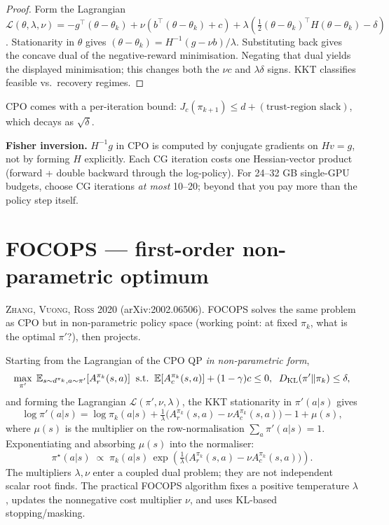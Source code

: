 \documentclass[11pt,oneside]{scrbook}
\begin{document}
\begin{proof}[Proof]
Form the Lagrangian
$\mathcal{L}(\theta, \lambda, \nu) = -g^\top(\theta-\theta_k) + \nu(b^\top(\theta-\theta_k) + c) + \lambda(\tfrac12 (\theta-\theta_k)^\top H (\theta-\theta_k) - \delta)$.
Stationarity in $\theta$ gives $(\theta-\theta_k) = H^{-1}(g - \nu b)/\lambda$.
Substituting back gives the concave dual of the negative-reward
minimisation. Negating that dual yields the displayed minimisation; this
changes both the $\nu c$ and $\lambda\delta$ signs. KKT classifies feasible vs.\ recovery regimes.
\end{proof}

CPO comes with a per-iteration bound:
$J_c(\pi_{k+1}) \leq d + (\text{trust-region slack})$, which decays as
$\sqrt{\delta}$.

\begin{pitfall}
\textbf{Fisher inversion.} $H^{-1} g$ in CPO is computed by conjugate gradients
on $Hv = g$, not by forming $H$ explicitly. Each CG iteration costs one
Hessian-vector product (forward + double backward through the log-policy).
For 24--32 GB single-GPU budgets, choose CG iterations \emph{at most} 10--20;
beyond that you pay more than the policy step itself.
\end{pitfall}

\section{FOCOPS --- first-order non-parametric optimum}

\textsc{Zhang, Vuong, Ross 2020} (arXiv:2002.06506). FOCOPS solves the same
problem as CPO but in non-parametric policy space (working point: at fixed
$\pi_k$, what is the optimal $\pi'$?), then projects.

Starting from the Lagrangian of the CPO QP \emph{in non-parametric form},
\[
   \max_{\pi'} \; \mathbb{E}_{s \sim d^{\pi_k}, a \sim \pi'}[A^{\pi_k}_r(s,a)]
   \;\;\text{s.t.}\;\; \mathbb{E}[A^{\pi_k}_c(s,a)] + (1-\gamma)c \leq 0,\;\; D_{\mathrm{KL}}(\pi' \Vert \pi_k) \leq \delta,
\]
and forming the Lagrangian $\mathcal{L}(\pi', \nu, \lambda)$, the KKT
stationarity in $\pi'(a|s)$ gives
\[
   \log \pi'(a|s) = \log \pi_k(a|s) + \tfrac{1}{\lambda}\bigl(A_r^{\pi_k}(s,a) - \nu A_c^{\pi_k}(s,a)\bigr) - 1 + \mu(s),
\]
where $\mu(s)$ is the multiplier on the row-normalisation $\sum_a \pi'(a|s) = 1$.
Exponentiating and absorbing $\mu(s)$ into the normaliser:
\begin{equation}\label{eq:focops-closed-form}
   \boxed{\;\;\pi^\star(a|s) \;\propto\; \pi_k(a|s) \, \exp\!\left( \tfrac{1}{\lambda}\bigl( A_r^{\pi_k}(s,a) - \nu A_c^{\pi_k}(s,a) \bigr) \right). \;\;}
\end{equation}
The multipliers $\lambda,\nu$ enter a coupled dual problem; they are not
independent scalar root finds. The practical FOCOPS algorithm fixes a
positive temperature $\lambda$, updates the nonnegative cost multiplier
$\nu$, and uses KL-based stopping/masking.
\end{document}
